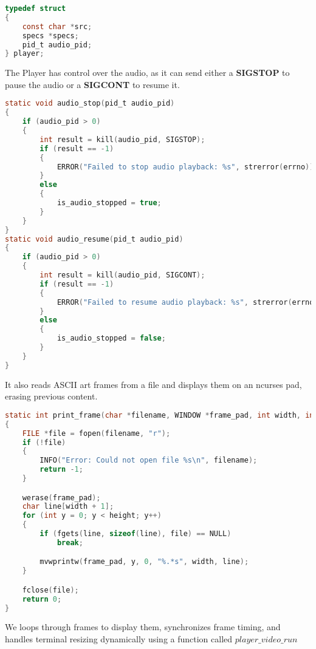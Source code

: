 \documentclass[a4paper,12pt]{article}
\begin{document}
\begin{lstlisting}[language=c]
typedef struct
{
    const char *src;
    specs *specs;
    pid_t audio_pid;
} player;
\end{lstlisting}

The Player has control over the audio, as it can send either a \textbf{SIGSTOP} to pause the audio or a \textbf{SIGCONT} to resume it.

\begin{lstlisting}[language=c]
static void audio_stop(pid_t audio_pid)
{
    if (audio_pid > 0)
    {
        int result = kill(audio_pid, SIGSTOP);
        if (result == -1)
        {
            ERROR("Failed to stop audio playback: %s", strerror(errno));
        }
        else
        {
            is_audio_stopped = true;
        }
    }
}
static void audio_resume(pid_t audio_pid)
{
    if (audio_pid > 0)
    {
        int result = kill(audio_pid, SIGCONT);
        if (result == -1)
        {
            ERROR("Failed to resume audio playback: %s", strerror(errno));
        }
        else
        {
            is_audio_stopped = false;
        }
    }
}
\end{lstlisting}

It also reads ASCII art frames from a file and displays them on an ncurses pad, erasing previous content.

\begin{lstlisting}[language=c]
static int print_frame(char *filename, WINDOW *frame_pad, int width, int height)
{
    FILE *file = fopen(filename, "r");
    if (!file)
    {
        INFO("Error: Could not open file %s\n", filename);
        return -1;
    }

    werase(frame_pad);
    char line[width + 1];
    for (int y = 0; y < height; y++)
    {
        if (fgets(line, sizeof(line), file) == NULL)
            break;

        mvwprintw(frame_pad, y, 0, "%.*s", width, line);
    }

    fclose(file);
    return 0;
}
\end{lstlisting}

We loops through frames to display them, synchronizes frame timing, and handles terminal resizing dynamically using a function called $player\_video\_run$
\end{document}
